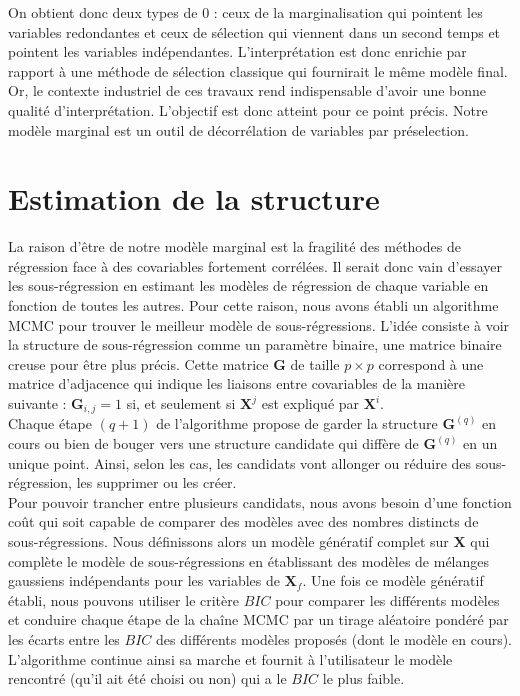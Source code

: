 \documentclass[12pt,a4paper]{report}
\begin{document}
	 On obtient donc deux types de 0 : ceux de la marginalisation qui pointent les variables redondantes et ceux de sélection qui viennent dans un second temps et pointent les variables indépendantes. L'interprétation est donc enrichie par rapport à une méthode de sélection classique qui fournirait le même modèle final. Or, le contexte industriel de ces travaux rend indispensable d'avoir une bonne qualité d'interprétation. L'objectif est donc atteint pour ce point précis. Notre modèle marginal est un outil de décorrélation de variables par préselection.
	 
	 \section{Estimation de la structure}
		La raison d'être de notre modèle marginal est la fragilité des méthodes de régression face à des covariables fortement corrélées. Il serait donc vain d'essayer les sous-régression en estimant les modèles de régression de chaque variable en fonction de toutes les autres. Pour cette raison, nous avons établi un algorithme MCMC pour trouver le meilleur modèle de sous-régressions. L'idée consiste à voir la structure de sous-régression comme un paramètre binaire, une matrice binaire creuse pour être plus précis. Cette matrice $\boldsymbol{G}$ de taille $p\times p$ correspond à une matrice d'adjacence qui indique les liaisons entre covariables de la manière suivante : $\boldsymbol{G}_{i,j}=1$ si, et seulement si $\boldsymbol{X}^j$ est expliqué par $\boldsymbol{X}^i$. \\
		
		Chaque étape $(q+1)$ de l'algorithme propose de garder la structure $\boldsymbol{G}^{(q)}$ en cours ou bien de bouger vers une structure candidate qui diffère de $\boldsymbol{G}^{(q)}$ en un unique point. Ainsi, selon les cas, les candidats vont allonger ou réduire des sous-régression, les supprimer ou les créer. \\
		Pour pouvoir trancher entre plusieurs candidats, nous avons besoin d'une fonction coût qui soit capable de comparer des modèles avec des nombres distincts de sous-régressions. Nous définissons alors un modèle génératif complet sur $\boldsymbol{X}$ qui complète le modèle de sous-régressions en établissant des modèles de mélanges gaussiens indépendants pour les variables de $\boldsymbol{X}_{f}$. Une fois ce modèle génératif établi, nous pouvons utiliser le critère $BIC$ pour comparer les différents modèles et conduire chaque étape de la chaîne MCMC par un tirage aléatoire pondéré par les écarts entre les $BIC$ des différents modèles proposés (dont le modèle en cours). L'algorithme continue ainsi sa marche et fournit à l'utilisateur le modèle rencontré (qu'il ait été choisi ou non) qui a le $BIC$ le plus faible. \\
		
\end{document}
